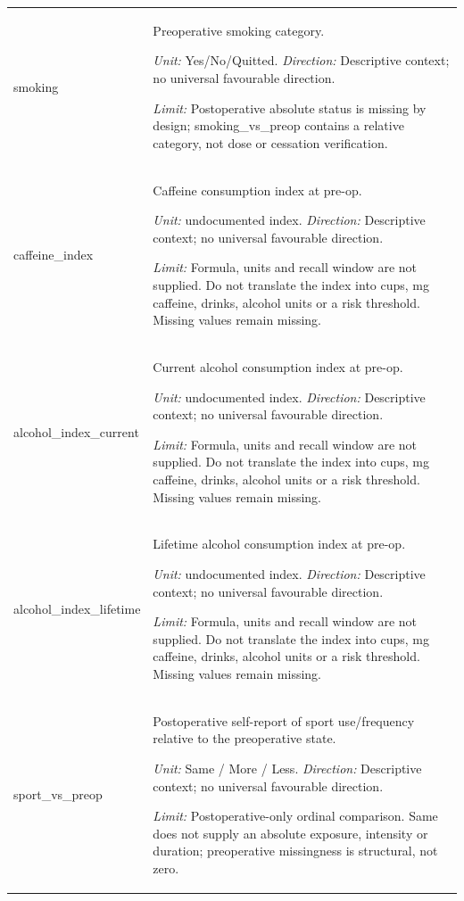 \begin{longtable}{p{.22\linewidth}p{.70\linewidth}}
{\ttfamily\footnotesize smoking} & Preoperative smoking category.\par\textit{Unit:} Yes/No/Quitted. \textit{Direction:} Descriptive context; no universal favourable direction.\par\textit{Limit:} Postoperative absolute status is missing by design; smoking\_vs\_preop contains a relative category, not dose or cessation verification. \\[1pt]
{\ttfamily\footnotesize caffeine\_\allowbreak{}index} & Caffeine consumption index at pre-op.\par\textit{Unit:} undocumented index. \textit{Direction:} Descriptive context; no universal favourable direction.\par\textit{Limit:} Formula, units and recall window are not supplied. Do not translate the index into cups, mg caffeine, drinks, alcohol units or a risk threshold. Missing values remain missing. \\[1pt]
{\ttfamily\footnotesize alcohol\_\allowbreak{}index\_\allowbreak{}current} & Current alcohol consumption index at pre-op.\par\textit{Unit:} undocumented index. \textit{Direction:} Descriptive context; no universal favourable direction.\par\textit{Limit:} Formula, units and recall window are not supplied. Do not translate the index into cups, mg caffeine, drinks, alcohol units or a risk threshold. Missing values remain missing. \\[1pt]
{\ttfamily\footnotesize alcohol\_\allowbreak{}index\_\allowbreak{}lifetime} & Lifetime alcohol consumption index at pre-op.\par\textit{Unit:} undocumented index. \textit{Direction:} Descriptive context; no universal favourable direction.\par\textit{Limit:} Formula, units and recall window are not supplied. Do not translate the index into cups, mg caffeine, drinks, alcohol units or a risk threshold. Missing values remain missing. \\[1pt]
{\ttfamily\footnotesize sport\_\allowbreak{}vs\_\allowbreak{}preop} & Postoperative self-report of sport use/frequency relative to the preoperative state.\par\textit{Unit:} Same / More / Less. \textit{Direction:} Descriptive context; no universal favourable direction.\par\textit{Limit:} Postoperative-only ordinal comparison. Same does not supply an absolute exposure, intensity or duration; preoperative missingness is structural, not zero. \\[1pt]

\end{longtable}
